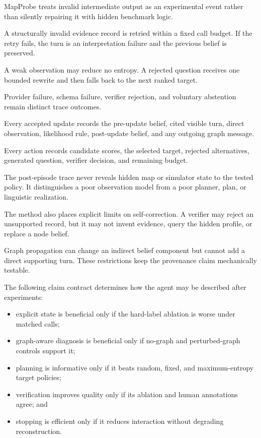 MapProbe treats invalid intermediate output as an experimental event rather than silently repairing it
with hidden benchmark logic.

A structurally invalid evidence record is retried within a fixed call budget. If the retry fails, the turn
is an interpretation failure and the previous belief is preserved.

A weak observation may reduce no entropy. A rejected question receives one bounded rewrite and then
falls back to the next ranked target.

Provider failure, schema failure, verifier rejection, and voluntary abstention remain distinct trace
outcomes.

Every accepted update records the pre-update belief, cited visible turn, direct observation, likelihood
rule, post-update belief, and any outgoing graph message.

Every action records candidate scores, the selected target, rejected alternatives, generated question,
verifier decision, and remaining budget.

The post-episode trace never reveals hidden map or simulator state to the tested policy. It distinguishes
a poor observation model from a poor planner, plan, or linguistic realization.

The method also places explicit limits on self-correction. A verifier may reject an unsupported record,
but it may not invent evidence, query the hidden profile, or replace a node belief.

Graph propagation can change an indirect belief component but cannot add a direct supporting turn.
These restrictions keep the provenance claim mechanically testable.

The following claim contract determines how the agent may be described after experiments:

\begin{itemize}[leftmargin=1.5em]
    \item explicit state is beneficial only if the hard-label ablation is worse under matched calls;
    \item graph-aware diagnosis is beneficial only if no-graph and perturbed-graph controls support it;
    \item planning is informative only if it beats random, fixed, and maximum-entropy target policies;
    \item verification improves quality only if its ablation and human annotations agree; and
    \item stopping is efficient only if it reduces interaction without degrading reconstruction.
\end{itemize}

